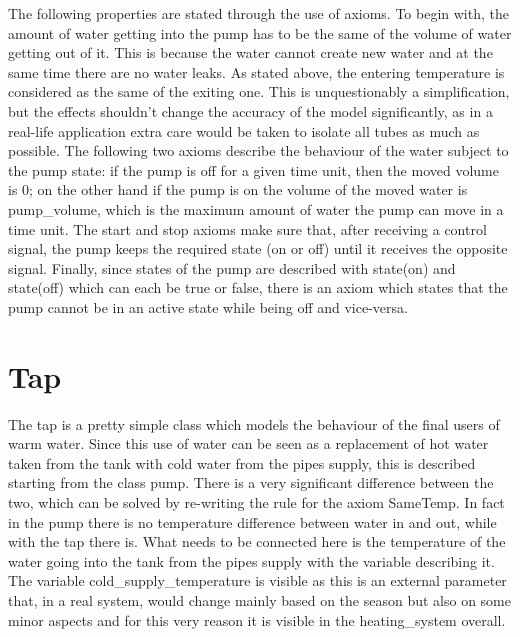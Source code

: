 \documentclass[a4paper,12pt]{article}
\begin{document}
The following properties are stated through the use of axioms. To begin with, the amount of water getting into the pump has to be the same of the volume of water getting out of it. This is because the water cannot create new water and at the same time there are no water leaks. As stated above, the entering temperature is considered as the same of the exiting one. This is unquestionably a simplification, but the effects shouldn't change the accuracy of the model significantly, as in a real-life application extra care would be taken to isolate all tubes as much as possible. The following two axioms describe the behaviour of the water subject to the pump state: if the pump is off for a given time unit, then the moved volume is 0; on the other hand if the pump is on the volume of the moved water is pump\_volume, which is the maximum amount of water the pump can move in a time unit. The start and stop axioms make sure that, after receiving a control signal, the pump keeps the required state (on or off) until it receives the opposite signal. Finally, since states of the pump are described with state(on) and state(off) which can each be true or false, there is an axiom which states that the pump cannot be in an active state while being off and vice-versa.

\pagebreak
\begin{adjustwidth}{-4em}{-4em}
\end{adjustwidth}
\pagebreak

\section{Tap}

The tap is a pretty simple class which models the behaviour of the final users of warm water. Since this use of water can be seen as a replacement of hot water taken from the tank with cold water from the pipes supply, this is described starting from the class pump. There is a very significant difference between the two, which can be solved by re-writing the rule for the axiom SameTemp. In fact in the pump there is no temperature difference between water in and out, while with the tap there is. What needs to be connected here is the temperature of the water going into the tank from the pipes supply with the variable describing it. The variable cold\_supply\_temperature is visible as this is an external parameter that, in a real system, would change mainly based on the season but also on some minor aspects and for this very reason it is visible in the heating\_system overall.
\end{document}
